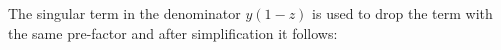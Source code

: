 %
%
%
%
%
The singular term in the denominator $ y(1-z) $ is used to drop the term with the same pre-factor and after simplification it follows:

